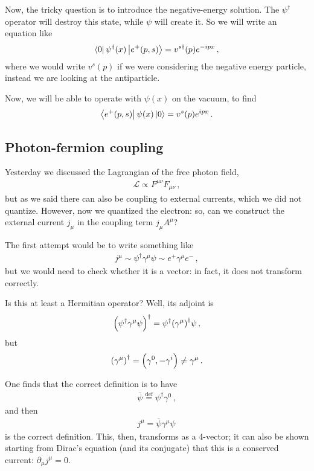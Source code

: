 \documentclass[main.tex]{subfiles}
\begin{document}
Now, the tricky question is to introduce the negative-energy solution. 
The \(\psi ^\dag\) operator will destroy this state, while \(\psi \) will create it. 
So we will write an equation like 
%
\begin{align}
\bra{0} \psi ^\dag (x) \ket{e^{+} (p, s)} 
= v^{s \dag} (p) e^{-ipx} 
\,,
\end{align}
%
where we would write \(v^{s}(p)\) if we were considering the negative energy particle, instead we are looking at the antiparticle.

Now, we will be able to operate with \(\psi (x)\) on the vacuum, to find 
%
\begin{align}
\bra{e^{+}(p, s)} \psi (x) \ket{0} = v^{s} (p) e^{ipx}
\,.
\end{align}

\subsection{Photon-fermion coupling}

Yesterday we discussed the Lagrangian of the free photon field, 
%
\begin{align}
\mathscr{L} \propto F^{\mu \nu } F_{\mu \nu }
\,,
\end{align}
%
but as we said there can also be coupling to external currents, which we did not quantize. 
However, now we quantized the electron: so, can we construct the external current \(j_{\mu }\) in the coupling term \(j_{\mu }A^{\mu }\)? 

The first attempt would be to write something like 
%
\begin{align}
j^{\mu } \sim \psi ^\dag \gamma^{\mu } \psi 
\sim e^{+} \gamma^{\mu } e^{-}
\,,
\end{align}
%
but we would need to check whether it is a vector: in fact, it does not transform correctly. 

Is this at least a Hermitian operator? Well, its adjoint is 
%
\begin{align}
\qty(\psi ^\dag \gamma^{\mu } \psi ) ^\dag = \psi ^\dag \qty(\gamma^{\mu })^\dag \psi 
\,,
\end{align}
%
but 
%
\begin{align}
\qty(\gamma^{\mu })^\dag = \qty(\gamma^{0}, - \gamma^{i}) \neq \gamma^{\mu }
\,.
\end{align}

One finds that the correct definition is to have 
%
\begin{align}
\overline{\psi} \overset{\text{def}}{=}
\psi ^\dag \gamma^{0}
\,,
\end{align}
%
and then 
%
\begin{align}
j^{\mu } = \overline{\psi} \gamma^{\mu } \psi 
\,
\end{align}
%
is the correct definition. This, then, transforms as a 4-vector; it can also be shown starting from Dirac's equation (and its conjugate) that this is a conserved current: \(\partial_{\mu } j^{\mu } = 0\). 
\end{document}
